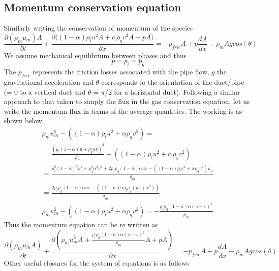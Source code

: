 \documentclass[a4paper,16pt]{article}
\begin{document}
\subsection{Momentum conservation equation}
Similarly writing the conservation of momentum of the species
\begin{equation}
\frac{\partial (\rho_{m}u_{m})A}{\partial t} + \frac{\partial{((1-\alpha)\rho_{l}u^2 A + \alpha \rho_{g}v^2 A + pA})} {\partial{x}} = -p_{fric} A + p\frac{dA}{dx} - \rho_m A g cos(\theta)
\label{cons_mix_mom}
\end{equation}
We assume mechanical equilibrium between phases and thus
\begin{equation}
p = p_l = p_g
\end{equation}
The $p_{fric}$ represents the friction losses associated with the pipe flow, $g$ the gravitational acceleration and $\theta$ corresponds to the orientation of the duct/pipe (= 0 to a vertical duct and $\theta$ = $\pi$/2 for a horizontal duct).
Following a similar approach to that taken to simply the flux in the gas conservation equation, let us write the momentum flux in terms of the average quantities. The working is as shown below
\begin{align}
\rho_m u_m ^2-((1-\alpha)\rho_{l}u^2+\alpha \rho_{g}v^2)=\\
=\frac{(\rho_l(1-\alpha)u+\rho_g \alpha v)^2}{\rho_m}-((1-\alpha)\rho_{l}u^2+\alpha \rho_{g}v^2)\\
=\frac{\rho_l^2(1-\alpha)^2u^2+\rho_g^2 \alpha^2 v^2 + 2 \rho_l \rho_g (1-\alpha)\alpha u v - ((1-\alpha)\rho_{l}u^2+\alpha \rho_{g}v^2) \rho_m}{\rho_m}\\
=\frac{2 \rho_l \rho_g (1-\alpha)\alpha u v - ((1-\alpha)\alpha \rho_{l}\rho_g (u^2+v^2))}{\rho_m}\\
\rho_m u_m ^2-((1-\alpha)\rho_{l}u^2+\alpha \rho_{g}v^2)=-\frac{\rho_l \rho_g (1-\alpha)\alpha (u-v)^2}{\rho_m}
\end{align}
Thus the momentum equation can be re written as
\begin{equation}
\frac{\partial (\rho_{m}u_{m}A)}{\partial t} + \frac{\partial({\rho_m u_m ^2 A + \frac{\rho_l \rho_g (1-\alpha)\alpha (u-v)^2}{\rho_m} A + pA})} {\partial{x}} = -p_{fric} A + p\frac{dA}{dx} - \rho_m A g cos(\theta)
\label{cons_mix_mom}
\end{equation}
Other useful closures for the system of equations is as follows 
\end{document}
